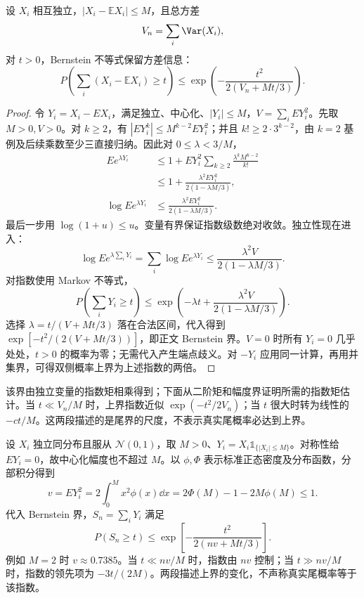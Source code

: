 \begin{proposition}
设 $X_i$ 相互独立，$|X_i-\mathbb E X_i|\le M$，且总方差
\[
V_n=\sum_i\Var(X_i),
\]
对 $t>0$，Bernstein 不等式保留方差信息：
\begin{equation}
P\!\left(
\sum_i(X_i-\mathbb E X_i)\ge t
\right)
\le
\exp\!\left(
-\frac{t^2}{2(V_n+Mt/3)}
\right).
\label{eq:math-stat-bernstein}
\end{equation}
\end{proposition}

\begin{proof}
令 $Y_i=X_i-EX_i$，满足独立、中心化、$|Y_i|\le M$，$V=\sum_iEY_i^2$。先取 $M>0,V>0$。对 $k\ge2$，有 $|EY_i^k|\le M^{k-2}EY_i^2$；并且 $k!\ge2\cdot3^{k-2}$，由 $k=2$ 基例及后续乘数至少三直接归纳。因此对 $0\le\lambda<3/M$，
\begin{align*}
 Ee^{\lambda Y_i}
 &\le1+EY_i^2\sum_{k\ge2}\frac{\lambda^kM^{k-2}}{k!}\\
 &\le1+\frac{\lambda^2EY_i^2}{2(1-\lambda M/3)},\\
 \log Ee^{\lambda Y_i}
 &\le\frac{\lambda^2EY_i^2}{2(1-\lambda M/3)}.
\end{align*}
最后一步用 $\log(1+u)\le u$。变量有界保证指数级数绝对收敛。独立性现在进入：
\[
 \log Ee^{\lambda\sum_iY_i}
 =\sum_i\log Ee^{\lambda Y_i}
 \le\frac{\lambda^2V}{2(1-\lambda M/3)}.
\]
对指数使用 Markov 不等式，
\[
 P\!\left(\sum_iY_i\ge t\right)
 \le\exp\left(-\lambda t+\frac{\lambda^2V}{2(1-\lambda M/3)}\right).
\]
选择 $\lambda=t/(V+Mt/3)$ 落在合法区间，代入得到 $\exp[-t^2/(2(V+Mt/3))]$，即正文 Bernstein 界。$V=0$ 时所有 $Y_i=0$ 几乎处处，$t>0$ 的概率为零；无需代入产生端点歧义。对 $-Y_i$ 应用同一计算，再用并集界，可得双侧概率上界为上述指数的两倍。
\end{proof}

该界由独立变量的指数矩相乘得到；下面从二阶矩和幅度界证明所需的指数矩估计。当 $t\ll V_n/M$ 时，上界指数近似 $\exp(-t^2/2V_n)$；当 $t$ 很大时转为线性的 $-ct/M$。这两段描述的是尾界的尺度，不表示真实尾概率必达到上界。

\begin{exbox}[有界截断中的方差尺度]
设 $X_i$ 独立同分布且服从 $\mathcal N(0,1)$，取 $M>0$、$Y_i=X_i\mathds{1}_{\{|X_i|\le M\}}$。对称性给 $EY_i=0$，故中心化幅度也不超过 $M$。以 $\phi,\Phi$ 表示标准正态密度及分布函数，分部积分得到
\[
 v=EY_i^2=2\int_0^M x^2\phi(x)\dd x
 =2\Phi(M)-1-2M\phi(M)\le1.
\]
代入 Bernstein 界，$S_n=\sum_iY_i$ 满足
\[
 P(S_n\ge t)\le\exp\!\left[-\frac{t^2}{2(nv+Mt/3)}\right].
\]
例如 $M=2$ 时 $v\approx0.7385$。当 $t\ll nv/M$ 时，指数由 $nv$ 控制；当 $t\gg nv/M$ 时，指数的领先项为 $-3t/(2M)$。两段描述上界的变化，不声称真实尾概率等于该指数。
\end{exbox}

